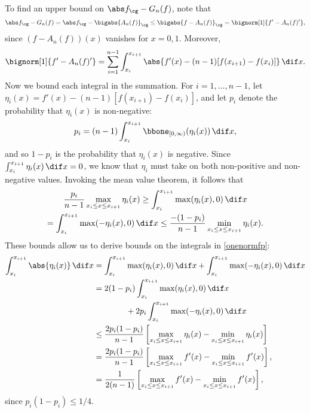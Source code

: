 To find an upper bound on $\Gnorm{f}-G_{n}(f)$, note that 
\begin{equation*}
\Gnorm{f} - G_{n}(f) = \Gnorm{f} - \bigabs{A_n(f)}_{\cg} \le \bigabs{f-A_n(f)}_{\cg} = \bignorm[1]{f' -A_n(f)'},
\end{equation*}
since $(f-A_n(f))(x)$ vanishes for $x=0,1$.  Moreover, 
\begin{equation} \label{onenormfp}
\bignorm[1]{f' -A_n(f)'} = \sum_{i=1}^{n-1} \int_{x_i}^{x_{i+1}} \abs{f'(x) -(n-1)[f(x_{i+1})-f(x_i)]} \, \dif x.
\end{equation}
Now we bound each integral in the summation.  For $i=1, \ldots, n-1$, let $\eta_i(x) = f'(x) -(n-1)[f(x_{i+1})-f(x_i)]$, and let $p_i$ denote the probability that $\eta_i(x)$ is non-negative:
\[
p_i = (n-1)\int_{x_i}^{x_{i+1}} \bbone_{[0,\infty)} (\eta_i(x)) \, \dif x,
\]
and so $1-p_i$ is the probability that $\eta_i(x)$ is negative.  Since $\int_{x_i}^{x_{i+1}} \eta_i(x) \, \dif x =0$, we know that $\eta_i$ must take on both non-positive and non-negative values.  Invoking the mean value theorem, it follows that 
\begin{multline*}
\frac{p_i}{n-1} \max_{x_i \le x \le x_{i+1}} \eta_i(x) \ge \int_{x_i}^{x_{i+1}} \max(\eta_i(x),0) \, \dif x \\
= \int_{x_i}^{x_{i+1}} \max(-\eta_i(x),0) \, \dif x \le \frac{-(1-p_i)}{n-1} \min_{x_i \le x \le x_{i+1}} \eta_i(x) .
\end{multline*}
These bounds allow us to derive bounds on the integrals in \eqref{onenormfp}:
\begin{align*}
\int_{x_i}^{x_{i+1}} \abs{\eta_i(x)} \, \dif x &= \int_{x_i}^{x_{i+1}} \max(\eta_i(x),0) \, \dif x + \int_{x_i}^{x_{i+1}} \max(-\eta_i(x),0) \, \dif x\\
&=2(1-p_i) \int_{x_i}^{x_{i+1}} \max(\eta_i(x),0) \, \dif x \\
& \qquad \qquad + 2p_i\int_{x_i}^{x_{i+1}} \max(-\eta_i(x),0) \, \dif x\\
&\le \frac{2p_i(1-p_i)}{n-1} \left[ \max_{x_i \le x \le x_{i+1}} \eta_i(x) - \min_{x_i \le x \le x_{i+1}} \eta_i(x) \right]\\
&=\frac{2p_i(1-p_i)}{n-1} \left[ \max_{x_i \le x \le x_{i+1}} f'(x) - \min_{x_i \le x \le x_{i+1}} f'(x) \right], \\
&=\frac{1}{2(n-1)} \left[ \max_{x_i \le x \le x_{i+1}} f'(x) - \min_{x_i \le x \le x_{i+1}} f'(x) \right],
\end{align*}
since $p_i(1-p_i)\le 1/4$.  

